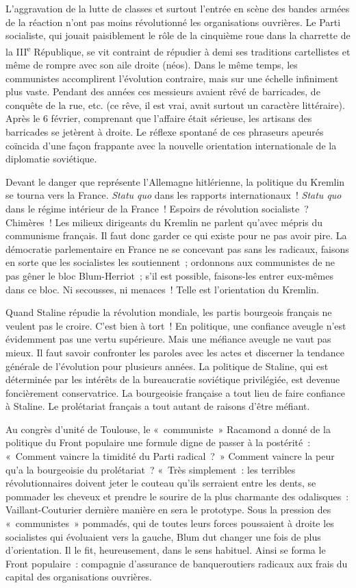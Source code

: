 \documentclass[french,twoside]{book} %
\begin{document}
L’aggravation de la lutte de classes et surtout l’entrée en scène des bandes armées de la réaction n’ont pas moins révolutionné les organisations ouvrières. Le Parti socialiste, qui jouait paisiblement le rôle de la cinquième roue dans la charrette de la III\textsuperscript{e} République, se vit contraint de répudier à demi ses traditions cartellistes et même de rompre avec son aile droite (néos). Dans le même temps, les communistes accomplirent l’évolution contraire, mais sur une échelle infiniment plus vaste. Pendant des années ces messieurs avaient rêvé de barricades, de conquête de la rue, etc. (ce rêve, il est vrai, avait surtout un caractère littéraire). Après le 6 février, comprenant que l’affaire était sérieuse, les artisans des barricades se jetèrent à droite. Le réflexe spontané de ces phraseurs apeurés coïncida d’une façon frappante avec la nouvelle orientation internationale de la diplomatie soviétique.\par
Devant le danger que représente l’Allemagne hitlérienne, la politique du Kremlin se tourna vers la France. \emph{Statu quo} dans les rapports internationaux ! \emph{Statu quo }dans le régime intérieur de la France ! Espoirs de révolution socialiste ? Chimères ! Les milieux dirigeants du Kremlin ne parlent qu’avec mépris du communisme français. Il faut donc garder ce qui existe pour ne pas avoir pire. La démocratie parlementaire en France ne se concevant pas sans les radicaux, faisons en sorte que les socialistes les soutiennent ; ordonnons aux communistes de ne pas gêner le bloc Blum-Herriot ; s’il est possible, faisons-les entrer eux-mêmes dans ce bloc. Ni secousses, ni menaces ! Telle est l’orientation du Kremlin.\par
Quand Staline répudie la révolution mondiale, les partis bourgeois français ne veulent pas le croire. C’est bien  à tort ! En politique, une confiance aveugle n’est évidemment pas une vertu supérieure. Mais une méfiance aveugle ne vaut pas mieux. Il faut savoir confronter les paroles avec les actes et discerner la tendance générale de l’évolution pour plusieurs années. La politique de Staline, qui est déterminée par les intérêts de la bureaucratie soviétique privilégiée, est devenue foncièrement conservatrice. La bourgeoisie française a tout lieu de faire confiance à Staline. Le prolétariat français a tout autant de raisons d’être méfiant.\par
Au congrès d’unité de Toulouse, le « communiste » Racamond a donné de la politique du Front populaire une formule digne de passer à la postérité : « Comment vaincre la timidité du Parti radical ? » Comment vaincre la peur qu’a la bourgeoisie du prolétariat ? « Très simplement : les terribles révolutionnaires doivent jeter le couteau qu’ils serraient entre les dents, se pommader les cheveux et prendre le sourire de la plus charmante des odalisques : Vaillant-Couturier dernière manière en sera le prototype. Sous la pression des « communistes » pommadés, qui de toutes leurs forces poussaient à droite les socialistes qui évoluaient vers la gauche, Blum dut changer une fois de plus d’orientation. Il le fit, heureusement, dans le sens habituel. Ainsi se forma le Front populaire : compagnie d’assurance de banqueroutiers radicaux aux frais du capital des organisations ouvrières.\par
\end{document}

